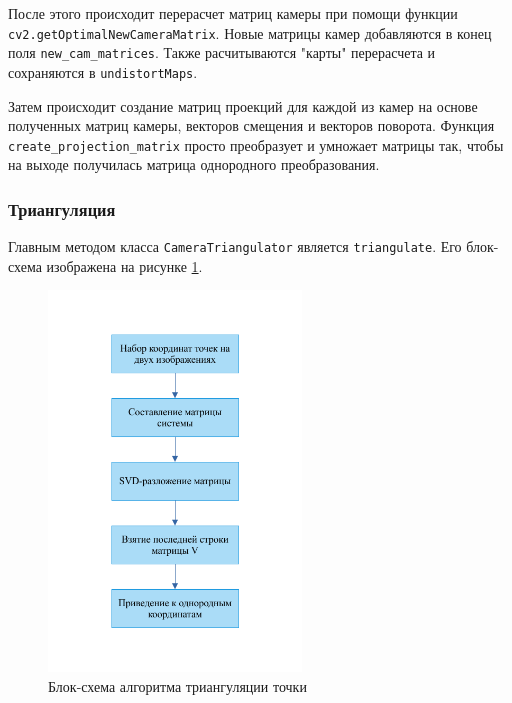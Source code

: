 \documentclass[12pt, a4paper]{article}
\begin{document}
После этого происходит перерасчет матриц камеры при помощи функции
\texttt{cv2.getOptimalNewCameraMatrix}. Новые матрицы камер добавляются в конец
поля \texttt{new\_cam\_matrices}. Также расчитываются "карты" перерасчета и
сохраняются в \texttt{undistortMaps}.

Затем происходит создание матриц проекций для каждой из камер на основе
полученных матриц камеры, векторов смещения и векторов поворота.
Функция \texttt{create\_projection\_matrix} просто преобразует и умножает
матрицы так, чтобы на выходе получилась матрица однородного преобразования.

\subsubsection{Триангуляция}
Главным методом класса \texttt{CameraTriangulator} является \texttt{triangulate}.
Его блок-схема изображена на рисунке \ref{fig:triangulation_scheme}.
\begin{figure}[h!]
  \begin{center}
    \includegraphics[width=0.6\textwidth]{images/block-schemes/triangulation_scheme.png}
  \end{center}
  \caption{Блок-схема алгоритма триангуляции точки}\label{fig:triangulation_scheme}
\end{figure}
\end{document}
